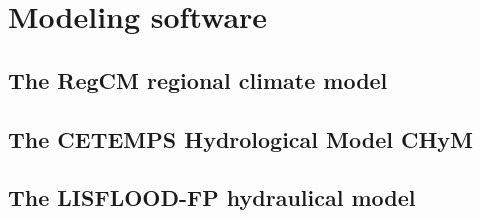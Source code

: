 \chapter{Modeling software}

\section{The RegCM regional climate model}

\section{The CETEMPS Hydrological Model CHyM}

\section{The LISFLOOD-FP hydraulical model}